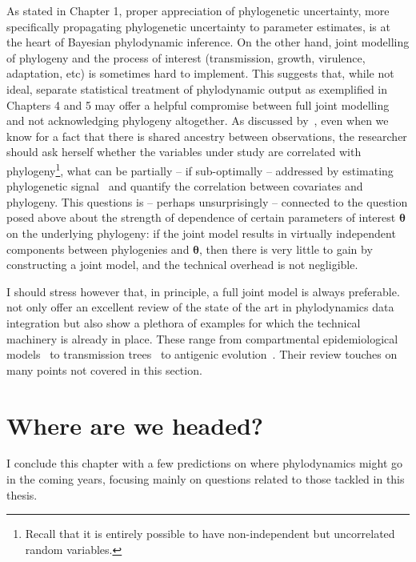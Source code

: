 As stated in Chapter 1, proper appreciation of phylogenetic uncertainty, more specifically propagating phylogenetic uncertainty to parameter estimates, is at the heart of Bayesian phylodynamic inference.
On the other hand, joint modelling of phylogeny and the process of interest (transmission, growth, virulence, adaptation, etc) is sometimes hard to implement.
This suggests that, while not ideal, separate statistical treatment of phylodynamic output as exemplified in Chapters 4 and 5 may offer a helpful compromise between full joint modelling and not acknowledging phylogeny altogether.
As discussed by~\cite{Baele2016}, even when we know for a fact that there is shared ancestry between observations, the researcher should ask herself whether the variables under study are correlated with phylogeny\footnote{Recall that it is entirely possible to have non-independent but uncorrelated random variables.}, what can be partially -- if sub-optimally -- addressed by estimating phylogenetic signal~\citep{Vrancken2015} and quantify the correlation between covariates and phylogeny.
This questions is -- perhaps unsurprisingly -- connected to the question posed above about the strength of dependence of certain parameters of interest $\boldsymbol\theta$ on the underlying phylogeny: if the joint model results in virtually independent components between phylogenies and $\boldsymbol\theta$, then there is very little to gain by constructing a joint model, and the technical overhead is not negligible.

I should stress however that, in principle, a full joint model is always preferable.
\cite{Baele2016} not only offer an excellent review of the state of the art in phylodynamics data integration but also show a plethora of examples for which the technical machinery is already in place.
These range from compartmental epidemiological models~\citep{Rasmussen2011} to transmission trees~\citep{Hall2015} to antigenic evolution~\citep{Bedford2015}.
Their review touches on many points not covered in this section.

\section{Where are we headed?}

I conclude this chapter with a few predictions on where phylodynamics might go in the coming years, focusing mainly on questions related to those tackled in this thesis.

